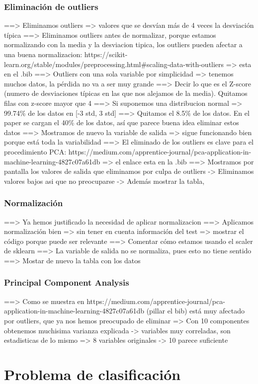 \documentclass[11pt]{article}
\begin{document}
\subsubsection{Eliminación de outliers}

==> Eliminamos outliers => valores que se desvían más de 4 veces la desviación típica
==> Eliminamos outliers antes de normalizar, porque estamos normalizando con la media y la desviacion tipica, los outliers pueden afectar a una buena normalizacion: https://scikit-learn.org/stable/modules/preprocessing.html\#scaling-data-with-outliers => esta en el .bib
==> Outliers con una sola variable por simplicidad => tenemos muchos datos, la pérdida no va a ser muy grande
==> Decir lo que es el Z-score (numero de desviaciones típicas en las que nos alejamos de la media). Quitamos filas con z-score mayor que 4
==> Si suponemos una distribucion normal => 99.74\% de los datos en [-3 std, 3 std]
==> Quitamos el 8.5\% de los datos. En el paper se cargan el 40\% de los datos, así que parece buena idea eliminar estos datos
==> Mostramos de nuevo la variable de salida => sigue funcionando bien porque está toda la variabilidad
==> El eliminado de los outliers es clave para el procedimiento PCA: https://medium.com/apprentice-journal/pca-application-in-machine-learning-4827c07a61db => el enlace esta en la .bib
==> Mostramos por pantalla los valores de salida que eliminamos por culpa de outliers -> Eliminamos valores bajos asi que no preocuparse -> Además mostrar la tabla,

\subsubsection{Normalización}

==> Ya hemos justificado la necesidad de aplicar normalizacion
==> Aplicamos normalización bien => sin tener en cuenta información del test => mostrar el código porque puede ser relevante
==> Comentar cómo estamos usando el scaler de sklearn
==> La variable de salida no se normaliza, pues esto no tiene sentido
==> Mostar de nuevo la tabla con los datos

\subsubsection{Principal Component Analysis}

==> Como se muestra en https://medium.com/apprentice-journal/pca-application-in-machine-learning-4827c07a61db (pillar el bib) está muy afectado por outliers, que ya nos hemos preocupado de eliminar
=> Con 10 componentes obtenemos muchisima varianza explicada -> variables muy correladas, son estadisticas de lo mismo
=> 8 variables originales -> 10 parece suficiente


\pagebreak
\section{Problema de clasificación}
\end{document}
